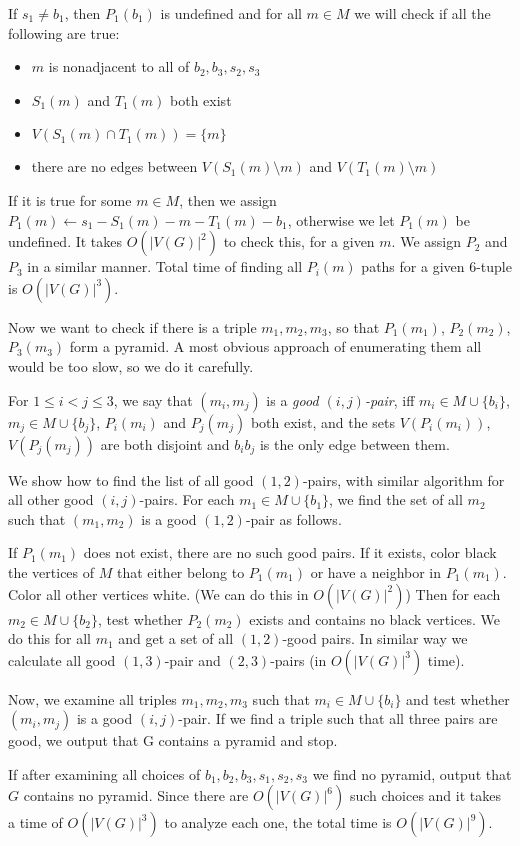 \begin{algtext2}
	If $s_1 \neq b_1$, then $P_1(b_1)$ is undefined and for all $m \in M$ we will check if all the following are true:
	\begin{itemize}
		\item $m$ is nonadjacent to all of $b_2, b_3, s_2, s_3$
		\item $S_1(m)$ and $T_1(m)$ both exist
		\item $V(S_1(m) \cap T_1(m)) = \{m\}$
		\item there are no edges between $V(S_1(m) \setminus m)$ and $V(T_1(m) \setminus m)$
	\end{itemize}
	If it is true for some $m \in M$, then we assign $P_1(m) \leftarrow s_1-S_1(m)-m-T_1(m)-b_1$, otherwise we let $P_1(m)$ be undefined. It takes $O(|V(G)|^2)$ to check this, for a given $m$. We assign $P_2$ and $P_3$ in a similar manner. Total time of finding all $P_i(m)$ paths for a given 6-tuple is $O(|V(G)|^3)$.

	Now we want to check if there is a triple $m_1, m_2, m_3$, so that $P_1(m_1)$, $P_2(m_2)$, $P_3(m_3)$ form a pyramid. A most obvious approach of enumerating them all would be too slow, so we do it carefully.

	For $1 \leq i < j \leq 3$, we say that $(m_i, m_j)$ is a \emph{good $(i, j)$-pair}, iff $m_i \in M \cup \{b_i\}$, $m_j \in M \cup \{b_j\}$, $P_i(m_i)$ and $P_j(m_j)$ both exist, and the sets $V(P_i(m_i))$,$V(P_j(m_j))$ are both disjoint and $b_ib_j$ is the only edge between them.

	We show how to find the list of all good $(1, 2)$-pairs, with similar algorithm for all other good $(i, j)$-pairs. For each $m_1 \in M \cup \{b_1\}$, we find the set of all $m_2$ such that $(m_1, m_2)$ is a good $(1,2)$-pair as follows.

	If $P_1(m_1)$ does not exist, there are no such good pairs. If it exists, color black the vertices of $M$ that either belong to $P_1(m_1)$ or have a neighbor in $P_1(m_1)$. Color all other vertices white. (We can do this in $O(|V(G)|^2)$) Then for each $m_2 \in M \cup \{b_2\}$, test whether $P_2(m_2)$ exists and contains no black vertices. We do this for all $m_1$ and get a set of all $(1,2)$-good pairs. In similar way we calculate all good $(1,3)$-pair and $(2,3)$-pairs (in $O(|V(G)|^3)$ time).

	Now, we examine all triples $m_1, m_2, m_3$ such that $m_i \in M \cup \{b_i\}$ and test whether $(m_i, m_j)$ is a good $(i, j)$-pair. If we find a triple such that all three pairs are good, we output that G contains a pyramid and stop.

	If after examining all choices of $b_1, b_2, b_3, s_1, s_2, s_3$ we find no pyramid, output that $G$ contains no pyramid. Since there are $O(|V(G)|^6)$ such choices and it takes a time of $O(|V(G)|^3)$ to analyze each one, the total time is $O(|V(G)|^9)$.
\end{algtext2}

